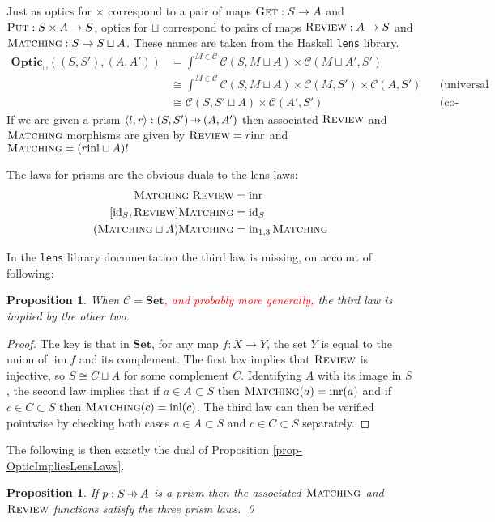 \documentclass[11pt,a4paper]{article}
\theoremstyle{plain}
\newtheorem{proposition}[theorem]{Proposition}
\theoremstyle{definition}
\newcommand{\C}{\mathscr{C}}
\newcommand{\Set}{\mathbf{Set}}
\newcommand{\Optic}{\mathbf{Optic}}
\newcommand{\id}{\mathrm{id}}
\newcommand{\inl}{\mathrm{inl}}
\newcommand{\inr}{\mathrm{inr}}
\DeclareMathOperator{\im}{im}
\newcommand{\fget}{\textsc{Get}}
\newcommand{\fput}{\textsc{Put}}
\newcommand{\freview}{\textsc{Review}}
\newcommand{\fmatching}{\textsc{Matching}}
\newcommand{\hto}{\ensuremath{\,\mathaccent\shortmid\rightarrow\,}}
\newcommand{\todo}[1]{\textcolor{red}{\small #1}}
\begin{document}
Just as optics for $\times$ correspond to a pair of maps $\fget : S \to A$ and $\fput : S \times A \to S$, optics for $\sqcup$ correspond to pairs of maps $\freview : A \to S$ and $\fmatching : S \to S \sqcup A$. These names are taken from the Haskell \texttt{lens} library.
\begin{align*}
\Optic_\sqcup((S, S'), (A, A')) &= \int^{M \in \C} \C(S, M \sqcup A) \times \C(M \sqcup A', S') \\
&\cong \int^{M \in \C} \C(S, M \sqcup A) \times \C(M, S') \times \C(A, S') && \text{(universal property of coproduct)} \\
&\cong \C(S, S' \sqcup A) \times \C(A', S') && \text{(co-Yoneda)}
\end{align*}
If we are given a prism $\langle l, r \rangle : (S, S') \hto (A, A')$ then associated $\freview$ and $\fmatching$ morphisms are given by $\freview = r \inr$ and $\fmatching = (r\inl \sqcup A)l$

The laws for prisms are the obvious duals to the lens laws: 
\begin{align*}
\fmatching \; \freview &= \inr \\
[\id_S, \freview] \fmatching &= \id_S \\
(\fmatching \sqcup A) \fmatching &= \mathrm{in}_{1,3} \, \fmatching
\end{align*}

In the \texttt{lens} library documentation the third law is missing, on account of following:

\begin{proposition}
When $\C = \Set$\todo{, and probably more generally,} the third law is implied by the other two.
\end{proposition}
\begin{proof}
The key is that in $\Set$, for any map $f : X \to Y$, the set $Y$ is equal to the union of $\im f$ and its complement. The first law implies that $\freview$ is injective, so $S \cong C \sqcup A$ for some complement $C$. Identifying $A$ with its image in $S$, the second law implies that if $a\in A \subset S$ then $\fmatching(a) = \inr(a)$ and if $c\in C \subset S$ then $\fmatching(c) = \inl(c)$. The third law can then be verified pointwise by checking both cases $a\in A \subset S$ and $c\in C \subset S$ separately.
\end{proof}

The following is then exactly the dual of Proposition \ref{prop-OpticImpliesLensLaws}.
\begin{proposition}
\label{prop-OpticImpliesPrismLaws}
If $p : S \hto A$ is a prism then the associated $\fmatching$ and $\freview$ functions satisfy the three prism laws. \qed
\end{proposition}
\end{document}

